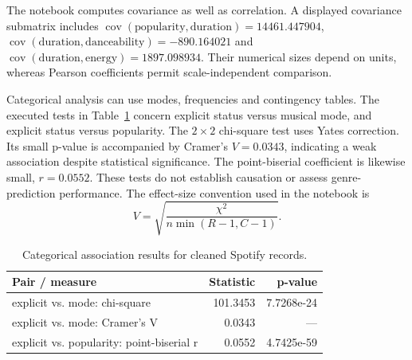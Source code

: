 \documentclass[12pt, a4paper]{article}
\begin{document}
The notebook computes covariance as well as correlation. A displayed covariance submatrix includes $\operatorname{cov}(\mathrm{popularity},\mathrm{duration})=14461.447904$, $\operatorname{cov}(\mathrm{duration},\mathrm{danceability})=-890.164021$ and $\operatorname{cov}(\mathrm{duration},\mathrm{energy})=1897.098934$. Their numerical sizes depend on units, whereas Pearson coefficients permit scale-independent comparison.

Categorical analysis can use modes, frequencies and contingency tables. The executed tests in Table~\ref{tab:spotify-association} concern explicit status versus musical mode, and explicit status versus popularity. The $2\times2$ chi-square test uses Yates correction. Its small p-value is accompanied by Cramer's $V=0.0343$, indicating a weak association despite statistical significance. The point-biserial coefficient is likewise small, $r=0.0552$. These tests do not establish causation or assess genre-prediction performance. The effect-size convention used in the notebook is
\[
V=\sqrt{\frac{\chi^2}{n\min(R-1,C-1)}}.
\]
\begin{table}[htbp]
\centering\small
\setlength{\tabcolsep}{4pt}\renewcommand{\arraystretch}{1.12}
\caption{Categorical association results for cleaned Spotify records.}
\label{tab:spotify-association}
\begin{tabular}{p{.57\linewidth}rr}
\toprule
\raggedright \textbf{Pair / measure} & \textbf{Statistic} & \textbf{p-value} \tabularnewline
\midrule
\raggedright explicit vs. mode: chi-square & 101.3453 & 7.7268e-24 \tabularnewline
\raggedright explicit vs. mode: Cramer's V & 0.0343 & --- \tabularnewline
\raggedright explicit vs. popularity: point-biserial r & 0.0552 & 4.7425e-59 \tabularnewline
\bottomrule
\end{tabular}
\end{table}
\end{document}
